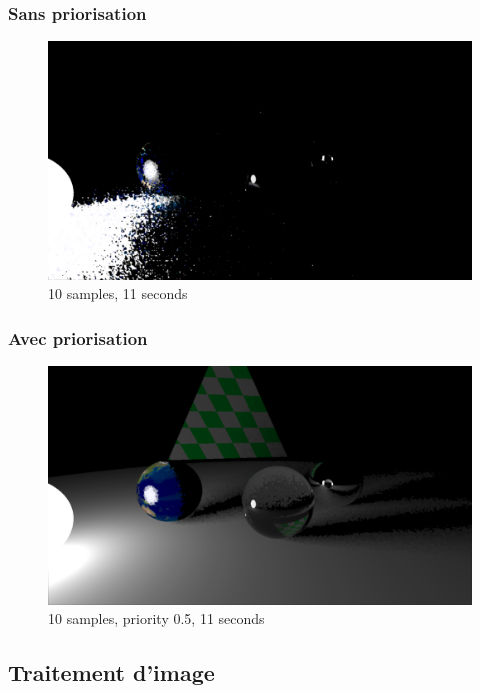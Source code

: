 \documentclass[handout]{beamer}
\begin{document}
\begin{frame}
    \frametitle{Sans priorisation}

    \begin{figure}
        \includegraphics[scale=0.25]{priorisation_off.png}
        \caption{10 samples, 11 seconds}
    \end{figure}

\end{frame}

\begin{frame}
    \frametitle{Avec priorisation}

    \begin{figure}
        \includegraphics[scale=0.25]{priorisation_on.png}
        \caption{10 samples, priority 0.5, 11 seconds}
    \end{figure}

\end{frame}

\subsection{Traitement d'image}
\end{document}
